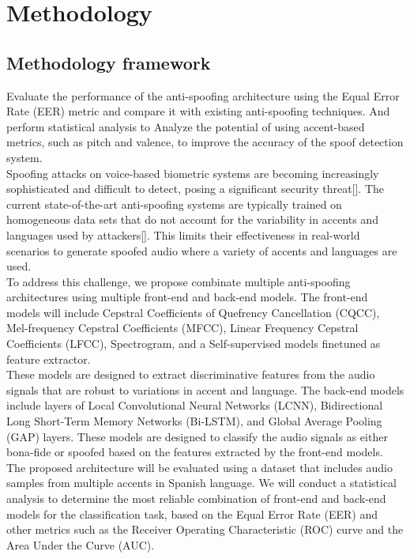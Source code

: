 \chapter{Methodology}

\section{Methodology framework}

Evaluate the performance of the anti-spoofing architecture using the Equal Error Rate (EER) metric and compare it with existing anti-spoofing techniques. And perform statistical analysis to Analyze the potential of using accent-based metrics, such as pitch and valence, to improve the accuracy of the spoof detection system.\\

Spoofing attacks on voice-based biometric systems are becoming increasingly sophisticated and difficult to detect, posing a significant security threat[]. The current state-of-the-art anti-spoofing systems are typically trained on homogeneous data sets that do not account for the variability in accents and languages used by attackers[]. This limits their effectiveness in real-world scenarios to generate spoofed audio where a variety of accents and languages are used.\\

To address this challenge, we propose combinate multiple anti-spoofing architectures using multiple front-end and back-end models. The front-end models will include Cepstral Coefficients of Quefrency Cancellation (CQCC), Mel-frequency Cepstral Coefficients (MFCC), Linear Frequency Cepstral Coefficients (LFCC), Spectrogram, and a Self-supervised models finetuned as feature extractor.\\

These models are designed to extract discriminative features from the audio signals that are robust to variations in accent and language. The back-end models include layers of Local Convolutional Neural Networks (LCNN), Bidirectional Long Short-Term Memory Networks (Bi-LSTM), and Global Average Pooling (GAP) layers. These models are designed to classify the audio signals as either bona-fide or spoofed based on the features extracted by the front-end models.\\

The proposed architecture will be evaluated using a dataset that includes audio samples from multiple accents in Spanish language. We will conduct a statistical analysis to determine the most reliable combination of front-end and back-end models for the classification task, based on the Equal Error Rate (EER) and other metrics such as the Receiver Operating Characteristic (ROC) curve and the Area Under the Curve (AUC).\\

